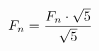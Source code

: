 \documentclass[preview]{standalone}
\begin{document}
\begin{align*}
\special{dvisvgm:raw <g id='unique000'>}F_n = \frac{F_n \cdot \sqrt{5}}{\sqrt{5}}\special{dvisvgm:raw </g>}
\end{align*}
\end{document}

